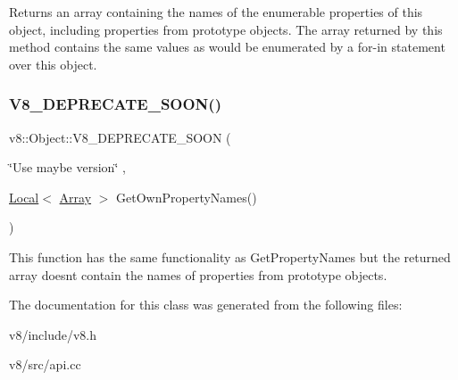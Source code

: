 Returns an array containing the names of the enumerable properties of this object, including properties from prototype objects. The array returned by this method contains the same values as would be enumerated by a for-\/in statement over this object. \mbox{\label{classv8_1_1Object_aa72e9d0d22d1d4a4c4b63827a5469d40}} 
\subsubsection{\texorpdfstring{V8\+\_\+\+D\+E\+P\+R\+E\+C\+A\+T\+E\+\_\+\+S\+O\+O\+N()}{V8\_DEPRECATE\_SOON()}\hspace{0.1cm}{\footnotesize\ttfamily [2/2]}}
{\footnotesize\ttfamily v8\+::\+Object\+::\+V8\+\_\+\+D\+E\+P\+R\+E\+C\+A\+T\+E\+\_\+\+S\+O\+ON (\begin{DoxyParamCaption}\item[{\char`\"{}Use maybe version\char`\"{}}]{,  }\item[{\mbox{\hyperlink{classv8_1_1Local}{Local}}$<$ \mbox{\hyperlink{classv8_1_1Array}{Array}} $>$ }]{Get\+Own\+Property\+Names() }\end{DoxyParamCaption})}

This function has the same functionality as Get\+Property\+Names but the returned array doesn\textquotesingle{}t contain the names of properties from prototype objects. 

The documentation for this class was generated from the following files\+:\begin{DoxyCompactItemize}
\item 
v8/include/v8.\+h\item 
v8/src/api.\+cc\end{DoxyCompactItemize}
